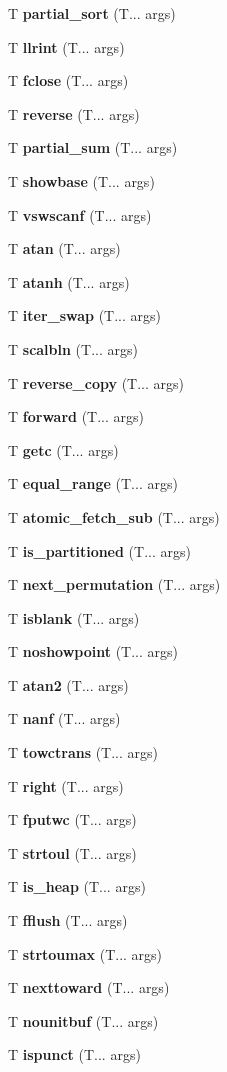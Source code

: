 \begin{DoxyCompactItemize}
\item 
T \textbf{ partial\+\_\+sort} (T... args)
\item 
T \textbf{ llrint} (T... args)
\item 
T \textbf{ fclose} (T... args)
\item 
T \textbf{ reverse} (T... args)
\item 
T \textbf{ partial\+\_\+sum} (T... args)
\item 
T \textbf{ showbase} (T... args)
\item 
T \textbf{ vswscanf} (T... args)
\item 
T \textbf{ atan} (T... args)
\item 
T \textbf{ atanh} (T... args)
\item 
T \textbf{ iter\+\_\+swap} (T... args)
\item 
T \textbf{ scalbln} (T... args)
\item 
T \textbf{ reverse\+\_\+copy} (T... args)
\item 
T \textbf{ forward} (T... args)
\item 
T \textbf{ getc} (T... args)
\item 
T \textbf{ equal\+\_\+range} (T... args)
\item 
T \textbf{ atomic\+\_\+fetch\+\_\+sub} (T... args)
\item 
T \textbf{ is\+\_\+partitioned} (T... args)
\item 
T \textbf{ next\+\_\+permutation} (T... args)
\item 
T \textbf{ isblank} (T... args)
\item 
T \textbf{ noshowpoint} (T... args)
\item 
T \textbf{ atan2} (T... args)
\item 
T \textbf{ nanf} (T... args)
\item 
T \textbf{ towctrans} (T... args)
\item 
T \textbf{ right} (T... args)
\item 
T \textbf{ fputwc} (T... args)
\item 
T \textbf{ strtoul} (T... args)
\item 
T \textbf{ is\+\_\+heap} (T... args)
\item 
T \textbf{ fflush} (T... args)
\item 
T \textbf{ strtoumax} (T... args)
\item 
T \textbf{ nexttoward} (T... args)
\item 
T \textbf{ nounitbuf} (T... args)
\item 
T \textbf{ ispunct} (T... args)

\end{DoxyCompactItemize}

